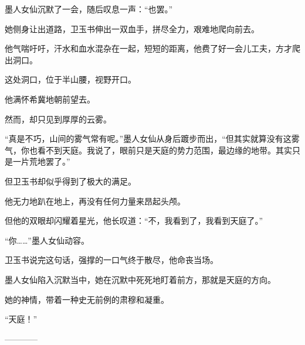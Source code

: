 \begin{this_body}
墨人女仙沉默了一会，随后叹息一声：“也罢。”

她侧身让出道路，卫玉书伸出一双血手，拼尽全力，艰难地爬向前去。

他气喘吁吁，汗水和血水混杂在一起，短短的距离，他费了好一会儿工夫，方才爬出洞口。

这处洞口，位于半山腰，视野开口。

他满怀希冀地朝前望去。

然而，却只见到厚厚的云雾。

“真是不巧，山间的雾气常有呢。”墨人女仙从身后踱步而出，“但其实就算没有这雾气，你也看不到天庭。我说了，眼前只是天庭的势力范围，最边缘的地带。其实只是一片荒地罢了。”

但卫玉书却似乎得到了极大的满足。

他无力地趴在地上，再没有任何力量来昂起头颅。

但他的双眼却闪耀着星光，他长叹道：“不，我看到了，我看到天庭了。”

“你……”墨人女仙动容。

卫玉书说完这句话，强撑的一口气终于散尽，他命丧当场。

墨人女仙陷入沉默当中，她在沉默中死死地盯着前方，那就是天庭的方向。

她的神情，带着一种史无前例的肃穆和凝重。

“天庭！”

------------

\end{this_body}

